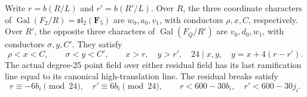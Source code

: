\begin{lemma}
\label{lem:B-RD94-ordering}
Write $r=b(R/L)$ and $r'=b(R'/L)$. Over $R$, the three coordinate
characters of $\operatorname{Gal}(F_2/R)=\mathfrak {sl}_2(\mathbf F_5)$
are $w_0,a_0,v_1$, with conductors $\rho,x,C$, respectively.
Over $R'$, the opposite three characters of
$\operatorname{Gal}(F_Q/R')$ are $v_0,d_0,w_1$, with conductors
$\sigma,y,C'$. They satisfy
\[
 \rho<x<C,\qquad \sigma<y<C',\qquad
 x>r,\quad y>r',\quad 24\mid x,y,\quad
 y=x+4(r-r').                                      \tag{B-RD94.5}
\]
The actual degree-25 point field over either residual field has
its last ramification line equal to its canonical high-translation
line. The residual breaks satisfy
\[
 r\equiv-6b_i\pmod {24},\quad
 r'\equiv6b_i\pmod {24},\qquad
 r<600-30b_i,\quad r'<600-30j_i.                    \tag{B-RD94.6}
\]
\end{lemma}
